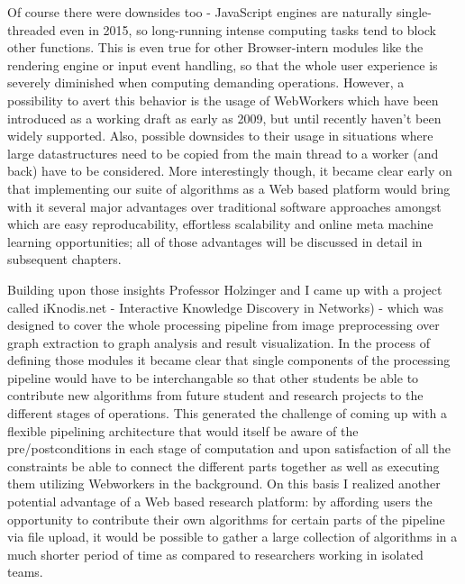 \par

Of course there were downsides too - JavaScript engines are naturally single-threaded even in 2015, so long-running intense computing tasks tend to block other functions. This is even true for other Browser-intern modules like the rendering engine or input event handling, so that the whole user experience is severely diminished when computing demanding operations. However, a possibility to avert this behavior is the usage of WebWorkers which have been introduced as a working draft as early as 2009, but until recently haven't been widely supported. Also, possible downsides to their usage in situations where large datastructures need to be copied from the main thread to a worker (and back) have to be considered. More interestingly though, it became clear early on that implementing our suite of algorithms as a Web based platform would bring with it several major advantages over traditional software approaches amongst which are easy reproducability, effortless scalability and online meta machine learning opportunities; all of those advantages will be discussed in detail in subsequent chapters.

\par

Building upon those insights Professor Holzinger and I came up with a project called iKnodis.net - Interactive Knowledge Discovery in Networks) - which was designed to cover the whole processing pipeline from image preprocessing over graph extraction to graph analysis and result visualization. In the process of defining those modules it became clear that single components of the processing pipeline would have to be interchangable so that other students be able to contribute new algorithms from future student and research projects to the different stages of operations. This generated the challenge of coming up with a flexible pipelining architecture that would itself be aware of the pre/postconditions in each stage of computation and upon satisfaction of all the constraints be able to connect the different parts together as well as executing them utilizing Webworkers in the background. On this basis I realized another potential advantage of a Web based research platform: by affording users the opportunity to contribute their own algorithms for certain parts of the pipeline via file upload, it would be possible to gather a large collection of algorithms in a much shorter period of time as compared to researchers working in isolated teams.

